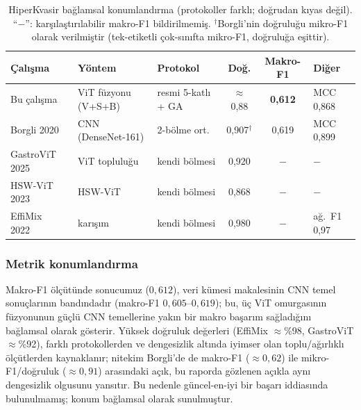 \begin{table}[H]
  \centering
  \footnotesize
  \caption{HiperKvasir bağlamsal konumlandırma (protokoller farklı; doğrudan kıyas
  değil). ``$-$'': karşılaştırılabilir makro-F1 bildirilmemiş. $^{\dagger}$Borgli'nin
  doğruluğu mikro-F1 olarak verilmiştir (tek-etiketli çok-sınıfta mikro-F1, doğruluğa
  eşittir).}
  \label{tab:context}
  \begin{tabularx}{\linewidth}{@{}l X l c c l@{}}
    \toprule
    Çalışma & Yöntem & Protokol & Doğ. & Makro-F1 & Diğer \\
    \midrule
    Bu çalışma & ViT füzyonu (V+S+B) & resmi 5-katlı + GA & $\approx$0,88 & \textbf{0,612} & MCC 0,868 \\
    Borgli 2020~\cite{borgli2020hyperkvasir} & CNN (DenseNet-161) & 2-bölme ort. & 0,907$^{\dagger}$ & 0,619 & MCC 0,899 \\
    GastroViT 2025~\cite{gastrovit2025} & ViT topluluğu & kendi bölmesi & 0,920 & $-$ & $-$ \\
    HSW-ViT 2023~\cite{wang2023hswvit} & HSW-ViT & kendi bölmesi & 0,868 & $-$ & $-$ \\
    EffiMix 2022~\cite{ramamurthy2022effimix} & karışım & kendi bölmesi & 0,980 & $-$ & ağ.\ F1 0,97 \\
    \bottomrule
  \end{tabularx}
\end{table}

\subsubsection{Metrik konumlandırma}
Makro-F1 ölçütünde sonucumuz ($0{,}612$), veri kümesi makalesinin CNN temel
sonuçlarının bandındadır (makro-F1 $0{,}605$–$0{,}619$); bu, üç ViT omurgasının
füzyonunun güçlü CNN temellerine yakın bir makro başarım sağladığını bağlamsal
olarak gösterir. Yüksek doğruluk değerleri (EffiMix $\approx$\%98, GastroViT
$\approx$\%92), farklı protokollerden ve dengesizlik altında iyimser olan
toplu/ağırlıklı ölçütlerden kaynaklanır; nitekim Borgli'de de makro-F1 ($\approx
0{,}62$) ile mikro-F1/doğruluk ($\approx 0{,}91$) arasındaki açık, bu raporda
gözlenen açıkla aynı dengesizlik olgusunu yansıtır. Bu nedenle güncel-en-iyi bir
başarı iddiasında bulunulmamış; konum bağlamsal olarak sunulmuştur.
